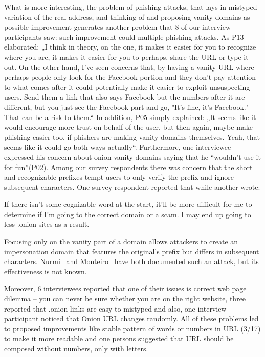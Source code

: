 What is more interesting, the problem of phishing attacks, that lays in mistyped variation of the real address, and thinking of and proposing vanity domains as possible improvement generates another problem that 8 of our interview participants saw: such improvement could multiple phishing attacks. As P13 elaborated: „I think in theory, on the one, it makes it easier for you to recognize where you are, it makes it easier for you to perhaps, share the URL or type it out. On the other hand, I've seen concerns that, by having a vanity URL where perhaps people only look for the Facebook portion and they don't pay attention to what comes after it could potentially make it easier to exploit unsuspecting users. Send them a link that also says Facebook but the numbers after it are different, but you just see the Facebook part and go, "It's fine, it's Facebook." That can be a risk to them.“  In addition, P05 simply explained:  „It seems like it would encourage more trust on behalf of the user, but then again, maybe make phishing easier too, if phishers are making vanity domains themselves. Yeah, that seems like it could go both ways actually“. Furthermore, one interviewee expressed his concern about onion vanity domains saying that he “wouldn’t use it for fun”(P02).
Among our survey respondents there was concern that the
short and recognizable prefixes tempt users to only verify the prefix and ignore
subsequent characters.  One survey respondent reported that   while another wrote:

\begin{displayquote}
If there isn't some cognizable word at the start, it'll be more difficult for me
to determine if I'm going to the correct domain or a scam. I may end up going to
less .onion sites as a result.
\end{displayquote}

Focusing only on the vanity part of a domain allows attackers to create an
impersonation domain that features the original's prefix but differs in
subsequent characters.  Nurmi~\cite{Nurmi2015a} and
Monteiro~\cite{Monteiro2016a} have both documented such an attack, but its
effectiveness is not known.

Moreover, 6 interviewees reported that one of their issues is correct web page dilemma – you can never be sure whether you are on the right website, three reported that .onion links are easy to mistyped and also, one interview participant noticed that Onion URL changes randomly. All of these problems led to proposed improvements like stable pattern of words or numbers in URL (3/17) to make it more readable and one persons suggested that URL should be composed without numbers, only with letters.

